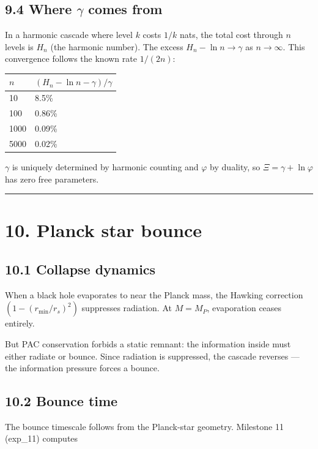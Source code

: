 \documentclass[11pt,a4paper]{article}
\begin{document}
\subsection*{9.4 Where $\gamma$ comes from}

In a harmonic cascade where level $k$ costs $1/k$ nats, the total cost through $n$ levels is $H_n$ (the harmonic number). The excess $H_n - \ln n \to \gamma$ as $n \to \infty$. This convergence follows the known rate $1/(2n)$:

\begin{longtable}[]{@{}ll@{}}
\toprule
$n$ & $(H_n - \ln n - \gamma)/\gamma$ \\
\midrule\endhead
10 & 8.5\% \\
100 & 0.86\% \\
1000 & 0.09\% \\
5000 & 0.02\% \\
\bottomrule
\end{longtable}

$\gamma$ is uniquely determined by harmonic counting and $\varphi$ by duality, so $\Xi = \gamma + \ln\varphi$ has zero free parameters.

\begin{center}\rule{0.5\linewidth}{0.4pt}\end{center}

\section*{10. Planck star bounce}

\subsection*{10.1 Collapse dynamics}

When a black hole evaporates to near the Planck mass, the Hawking correction $(1 - (r_{\text{min}}/r_s)^2)$ suppresses radiation. At $M = M_P$, evaporation ceases entirely.

But PAC conservation forbids a static remnant: the information inside must either radiate or bounce. Since radiation is suppressed, the cascade reverses — the information pressure forces a bounce.

\subsection*{10.2 Bounce time}

The bounce timescale follows from the Planck-star geometry. Milestone 11 (exp\_11) computes
\end{document}
